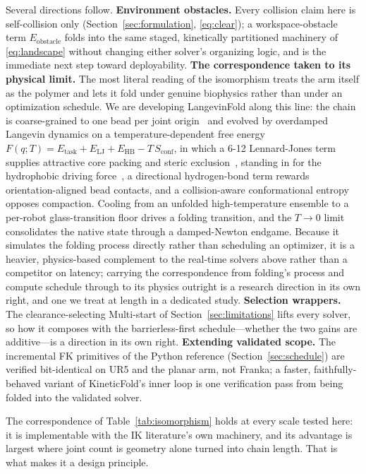 \documentclass[10pt,conference]{IEEEtran}
\begin{document}
Several directions follow. \textbf{Environment obstacles.} Every collision claim
here is self-collision only (Section~\ref{sec:formulation},
\eqref{eq:clear}); a workspace-obstacle term $E_{\mathrm{obstacle}}$ folds into
the same staged, kinetically partitioned machinery of \eqref{eq:landscape}
without changing either solver's organizing logic, and is the immediate next step
toward deployability. \textbf{The correspondence taken to its physical limit.}
The most literal reading of the isomorphism treats the arm itself as the polymer
and lets it fold under genuine biophysics rather than under an optimization
schedule. We are developing LangevinFold along this line: the chain is
coarse-grained to one bead per joint origin~\cite{b32} and evolved by overdamped
Langevin dynamics on a temperature-dependent free energy
$F(q; T) = E_{\mathrm{task}} + E_{\mathrm{LJ}} + E_{\mathrm{HB}} - T\,S_{\mathrm{conf}}$,
in which a 6-12 Lennard-Jones term supplies attractive core packing and steric
exclusion~\cite{b32}, standing in for the hydrophobic driving force~\cite{b33}, a
directional hydrogen-bond term rewards orientation-aligned bead contacts, and a
collision-aware conformational entropy opposes compaction. Cooling from an
unfolded high-temperature ensemble to a per-robot glass-transition floor drives a
folding transition, and the $T \rightarrow 0$ limit consolidates the native state
through a damped-Newton endgame. Because it simulates the folding process
directly rather than scheduling an optimizer, it is a heavier, physics-based
complement to the real-time solvers above rather than a competitor on latency;
carrying the correspondence from folding's process and compute schedule through
to its physics outright is a research direction in its own right, and one we
treat at length in a dedicated study. \textbf{Selection wrappers.} The
clearance-selecting Multi-start of Section~\ref{sec:limitations} lifts every
solver, so how it composes with the barrierless-first schedule---whether the two
gains are additive---is a direction in its own right. \textbf{Extending validated
scope.} The incremental FK primitives of the Python reference
(Section~\ref{sec:schedule}) are verified bit-identical on UR5 and the planar
arm, not Franka; a faster, faithfully-behaved variant of KineticFold's inner loop
is one verification pass from being folded into the validated solver.

The correspondence of Table~\ref{tab:isomorphism} holds at every scale tested
here: it is implementable with the IK literature's own machinery, and its
advantage is largest where joint count is geometry alone turned into chain
length. That is what makes it a design principle.
\end{document}
